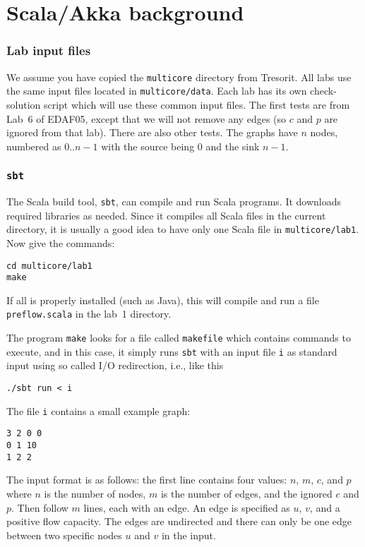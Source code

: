 \documentclass{forsete}
\begin{document}
\newpage
\section{Scala/Akka background}

\subsubsection*{Lab input files}
We assume you have copied the {\tt multicore} directory from Tresorit.
All labs use the same input files located in {\tt multicore/data}.
Each lab has its own check-solution script which will use these common
input files. The first tests are from Lab~6 of EDAF05, except that we will not
remove any edges (so $c$ and $p$ are ignored from that lab). There are also other tests.
The graphs have $n$ nodes, numbered as $0..n-1$ with the source being $0$ and
the sink $n-1$.

\subsubsection*{{\tt sbt}}
The Scala build tool, {\tt sbt}, can compile and run Scala programs. It downloads required libraries as needed.
Since it compiles all Scala files in the current directory, it is usually a good idea to have only one Scala file
in {\tt multicore/lab1}.
Now give the commands:
\begin{verbatim}
cd multicore/lab1
make
\end{verbatim}
If all is properly installed (such as Java), this will compile and run a file {\tt preflow.scala} in the
lab~1 directory.

The program {\tt make} looks for a file called {\tt makefile} which contains commands to execute, and in this
case, it simply runs {\tt sbt} with an input file {\tt i} as standard input using so called I/O redirection, i.e.,
like this
\begin{verbatim}
./sbt run < i
\end{verbatim}
The file {\tt i} contains a small example graph:
\begin{verbatim}
3 2 0 0
0 1 10
1 2 2
\end{verbatim}
The input format is as follows: the first line contains four values: $n$, $m$, $c$, and $p$ where $n$ is the number of nodes, $m$ is the number of edges, and the ignored $c$ and $p$.
Then follow $m$ lines, each with an edge. An edge is specified as $u$, $v$, and a positive flow capacity. The edges
are undirected and there can only be one edge between two specific nodes $u$ and $v$ in the input.
\end{document}
